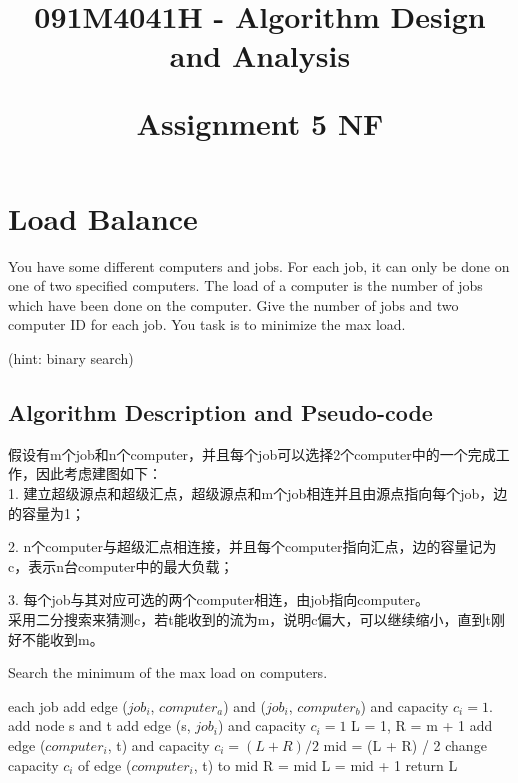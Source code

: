 \documentclass{article}
\begin{document}

\title{091M4041H - Algorithm Design and Analysis\\ [2ex] \begin{large} Assignment 5 NF\end{large}}


\maketitle

\tableofcontents

\newpage
\section{Load Balance}
You have some different computers and jobs. For each job, it can only be done on one of two specified computers. The load of a computer is the number of jobs which have been done on the computer. Give the number of jobs and two computer ID for each job. You task is to minimize the max load. 

(hint: binary search)

\subsection{Algorithm Description and Pseudo-code}
假设有m个job和n个computer，并且每个job可以选择2个computer中的一个完成工作，因此考虑建图如下：\\


1. 建立超级源点和超级汇点，超级源点和m个job相连并且由源点指向每个job，边的容量为1；

2. n个computer与超级汇点相连接，并且每个computer指向汇点，边的容量记为c，表示n台computer中的最大负载；

3. 每个job与其对应可选的两个computer相连，由job指向computer。\\


采用二分搜索来猜测c，若t能收到的流为m，说明c偏大，可以继续缩小，直到t刚好不能收到m。

\begin{algorithm}[htbp]  
  \caption{Search the minimum of the max load on computers.}  
  \begin{algorithmic}[1] 
	\For each job
	\State add edge ($job_i$, $computer_a$) and ($job_i$, $computer_b$) and capacity $c_i = 1.$
	\EndFor
	\State add node s and t
	\State add edge (s, $job_i$) and capacity $c_i = 1$
	\State L = 1, R = m + 1
	\State add edge ($computer_i$, t) and capacity $c_i = (L + R)/ 2$
	\State mid = (L + R) / 2
 	\State change capacity $c_i$ of edge ($computer_i$, t) to mid
	\State R = mid
	\Else
	\State L = mid + 1
	\EndIf
	\EndWhile
	\State return L
    \EndFunction 
  \end{algorithmic}  
\end{algorithm} 
\end{document}
